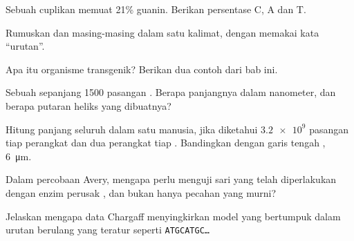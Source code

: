 \begin{exercise}[$\star$]\label{exo:g10:universal-dna:3}
Sebuah cuplikan  memuat 21\% guanin. Berikan persentase C, A dan
T.
\end{exercise}

\begin{exercise}[$\star$]\label{exo:g10:universal-dna:4}
Rumuskan  dan  masing-masing dalam satu kalimat, dengan memakai
kata ``urutan''.
\end{exercise}

\begin{exercise}[$\star$]\label{exo:g10:universal-dna:5}
Apa itu organisme transgenik? Berikan dua contoh dari bab ini.
\end{exercise}

\begin{exercise}[$\star\star$]\label{exo:g10:universal-dna:6}
Sebuah  sepanjang 1500 pasangan . Berapa panjangnya dalam
nanometer, dan berapa putaran heliks yang dibuatnya?
\end{exercise}

\begin{exercise}[$\star\star$]\label{exo:g10:universal-dna:7}
Hitung panjang seluruh  dalam satu  manusia, jika diketahui
$\num{3.2e9}$ pasangan  tiap perangkat  dan dua perangkat
tiap . Bandingkan dengan garis tengah , \qty{6}{\micro m}.
\end{exercise}

\begin{exercise}[$\star\star$]\label{exo:g10:universal-dna:8}
Dalam percobaan Avery, mengapa perlu menguji sari yang telah
diperlakukan dengan enzim perusak , dan bukan hanya pecahan  yang
murni?
\end{exercise}

\begin{exercise}[$\star\star$]\label{exo:g10:universal-dna:9}
Jelaskan mengapa data Chargaff menyingkirkan model yang 
bertumpuk dalam urutan berulang yang teratur seperti \texttt{ATGCATGC\dots}
\end{exercise}


